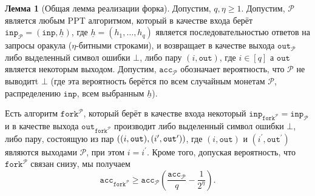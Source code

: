 \documentclass{mrl}
\theoremstyle{definition}
\numberwithin{theorem}{subsection}
\newtheorem{lemma}[theorem]{Лемма}
\newcommand{\adversary}{\mathcal{A}}
\begin{document}

\begin{lemma}[Общая лемма реализации форка]\label{genfork}
Допустим, $q, \eta \geq 1$. Допустим, $\mathcal{P}$ является любым PPT алгоритмом, который в качестве входа берёт $\texttt{inp}_\mathcal{P} = (\texttt{inp}, \underline{h})$, где $\underline{h} = (h_1, \ldots, h_q)$ является последовательностью ответов на запросы оракула ($\eta$-битными строками), и возвращает в качестве выхода $\texttt{out}_{\mathcal{P}}$ либо выделенный символ ошибки $\bot$, либо пару $(i, \texttt{out})$, где $i \in [q]$ а $\texttt{out}$ является некоторым выходом. Допустим, $\texttt{acc}_{\mathcal{P}}$ обозначает вероятность, что $\mathcal{P}$ не выводитt $\bot$ (где эта вероятность берётся по всем случайным монетам $\mathcal{P}$, распределению $\texttt{inp}$, всем выбранным $\underline{h}$).

Есть алгоритм $\texttt{fork}^{\mathcal{P}}$, который берёт в качестве входа некоторый $\texttt{inp}_{\texttt{fork}^{\mathcal{P}}} = \texttt{inp}_{\mathcal{P}}$ и в качестве выхода $\texttt{out}_{\texttt{fork}^{\mathcal{P}}}$ производит либо выделенный символ ошибки $\bot$, либо пару, состоящую из пар $((i, \texttt{out}), \linebreak (i^\prime, \texttt{out}^\prime))$, где $(i, \texttt{out})$ и $(i^\prime, \texttt{out}^\prime)$ являются выходами $\mathcal{P}$, при этом $i = i^\prime$. Кроме того, допуская вероятность, что $\texttt{fork}^{\mathcal{P}}$ связан снизу, мы получаем \[\texttt{acc}_{\texttt{fork}^{\mathcal{P}}} \geq \texttt{acc}_{\mathcal{P}} \left(\frac{\texttt{acc}_{\mathcal{P}}}{q} - \frac{1}{2^\eta}\right).\]
\end{lemma}
\end{document}
